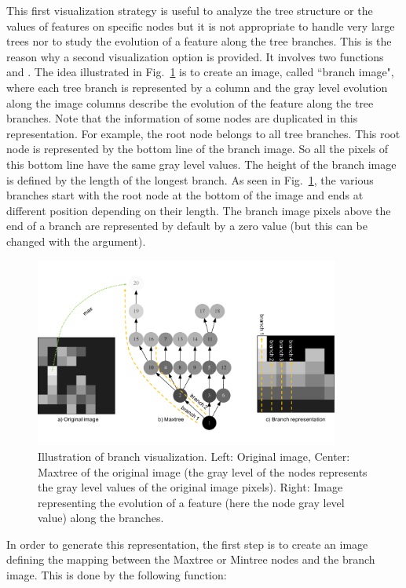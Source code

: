 \documentclass[DIV=calc, paper=a4, fontsize=11pt]{scrartcl}	 %
\begin{document}
This first visualization strategy is useful to analyze the tree structure or the values of features on specific nodes but it is not appropriate to handle very large trees nor to study the evolution of a feature along the tree branches. This is the reason why a second visualization option is provided. It involves two functions  and . The idea illustrated in Fig.~\ref{fig:visualization} is to create an image, called ``branch image", where each tree branch is represented by a column and the gray level evolution along the image columns describe the evolution of the feature along the tree branches. Note that the information of some nodes are duplicated in this representation. For example, the root node belongs to all tree branches. This root node is represented by the bottom line of the branch image. So all the pixels of this bottom line have the same gray level values. The height of the branch image is defined by the length of the longest branch. As seen in Fig.~\ref{fig:visualization}, the various branches start with the root node at the bottom of the image and ends at different position depending on their length. The branch image pixels above the end of a branch are represented by default by a zero value (but this can be changed with the  argument). 
\begin{figure}[t]
\centering
\includegraphics[width=10cm]{Fig/Visualization.pdf}  
\caption{Illustration of branch visualization. Left: Original image, Center: Maxtree of the original image (the gray level of the nodes represents the gray level values of the original image pixels). Right: Image representing the evolution of a feature (here the node gray level value) along the branches.}
\label{fig:visualization}
\end{figure}

In order to generate this representation, the first step is to create an image defining the mapping between the Maxtree or Mintree nodes and the branch image. This is done by the following function: 
\end{document}
